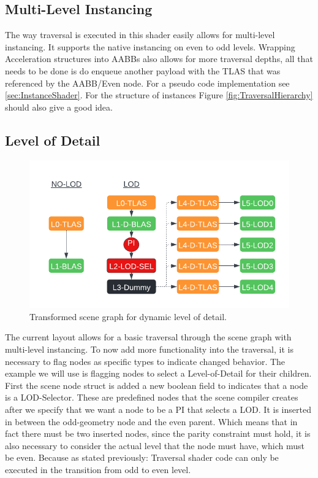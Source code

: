 \subsection{Multi-Level Instancing}
\label{sec:ImplMuliLevelInstancing}
The way traversal is executed in this shader easily allows for multi-level instancing. It supports the native instancing on even to odd levels. Wrapping Acceleration structures into AABBs also allows for more traversal depths, all that needs to be done is do enqueue another payload with the TLAS that was referenced by the AABB/Even node. For a pseudo code implementation see \ref{sec:InstanceShader}. For the structure of instances Figure \ref{fig:TraversalHierarchy} should also give a good idea.
\subsection{Level of Detail}
\label{sec:ImplLevelOfDetail}
\begin{figure}[h]
    \centering
    \includegraphics[width=.8\textwidth]{images/showcase/LOD-Select.pdf}
    \caption{Transformed scene graph for dynamic level of detail.}
    \label{fig:LODGraph}
\end{figure}
The current layout allows for a basic traversal through the scene graph with multi-level instancing. To now add more functionality into the traversal, it is necessary to flag nodes as specific types to indicate changed behavior. The example we will use is flagging nodes to select a Level-of-Detail for their children. First the scene node struct is added a new boolean field to indicates that a node is a LOD-Selector. These are predefined nodes that the scene compiler creates after we specify that we want a node to be a PI that selects a LOD. It is inserted in between the odd-geometry node and the even parent. Which means that in fact there must be two inserted nodes, since the parity constraint must hold, it is also necessary to consider the actual level that the node must have, which must be even. Because as stated previously: Traversal shader code can only be executed in the transition from odd to even level. 
